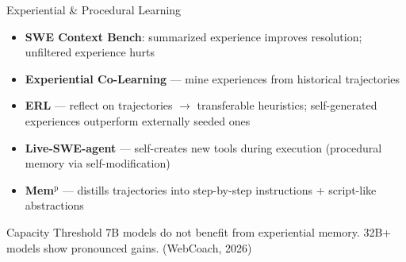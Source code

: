 \documentclass[aspectratio=169]{beamer}
\begin{document}
\begin{frame}{Experiential \& Procedural Learning}
  \begin{itemize}
    \item \textbf{SWE Context Bench}: summarized experience improves resolution;
      \alert{unfiltered experience hurts}
    \item \textbf{Experiential Co-Learning} --- mine experiences from historical trajectories
    \item \textbf{ERL} --- reflect on trajectories $\rightarrow$ transferable heuristics;
      self-generated experiences outperform externally seeded ones
    \item \textbf{Live-SWE-agent} --- self-creates new tools during execution (procedural memory via self-modification)
    \item \textbf{Mem$^{\mathrm{p}}$} --- distills trajectories into step-by-step
      instructions + script-like abstractions
  \end{itemize}

  \vspace{0.3cm}

  \begin{alertblock}{Capacity Threshold}
    7B models do not benefit from experiential memory.
    32B+ models show pronounced gains. (WebCoach, 2026)
  \end{alertblock}
\end{frame}
\end{document}
